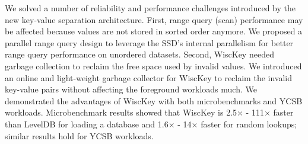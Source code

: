 We solved a number of reliability and performance challenges
introduced by the new key-value separation architecture.
First, range query (scan) performance may be affected because values
are not stored in sorted order anymore.  We proposed a parallel range
query design to leverage the SSD's internal parallelism for better range
query performance on unordered datasets. 
Second, WiscKey needed garbage collection to reclaim the free
space used by invalid values. We introduced an online and light-weight
garbage collector for WiscKey to reclaim the invalid key-value pairs
without affecting the foreground workloads much. We demonstrated the
advantages of WiscKey with both 
microbenchmarks and YCSB workloads. Microbenchmark results showed that
WiscKey is 2.5$\times$ - 111$\times$ faster than LevelDB for loading a
database and 1.6$\times$ - 14$\times$ faster for random lookups;
similar results hold for YCSB workloads. 

